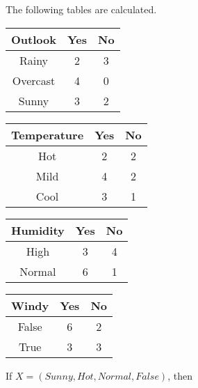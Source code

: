 \documentclass[11pt, a4paper]{article}
\begin{document}
\noindent The following tables are calculated.

\begin{table}[h!]
	\centering
	\label{tab:table2}
	\begin{tabular}{c|cc}
		\toprule
		\textbf{Outlook} & \textbf{Yes} & \textbf{No} \\
		\midrule
		Rainy            & 2            & 3           \\
		Overcast         & 4            & 0           \\
		Sunny            & 3            & 2           \\
	\end{tabular}
	\hspace{2em}
	\vspace{2em}
	\label{tab:table3}
	\begin{tabular}{c|cc}
		\toprule
		\textbf{Temperature} & \textbf{Yes} & \textbf{No} \\
		\midrule
		Hot                  & 2            & 2           \\
		Mild                 & 4            & 2           \\
		Cool                 & 3            & 1           \\
	\end{tabular}
	\label{tab:table4}
	\begin{tabular}{c|cc}
		\toprule
		\textbf{Humidity} & \textbf{Yes} & \textbf{No} \\
		\midrule
		High              & 3            & 4           \\
		Normal            & 6            & 1           \\
	\end{tabular}
	\hspace{2em}
	\label{tab:table5}
	\begin{tabular}{c|cc}
		\toprule
		\textbf{Windy} & \textbf{Yes} & \textbf{No} \\
		\midrule
		False          & 6            & 2           \\
		True           & 3            & 3           \\
	\end{tabular}
\end{table}

If $X = (Sunny, Hot, Normal, False)$, then
\end{document}
